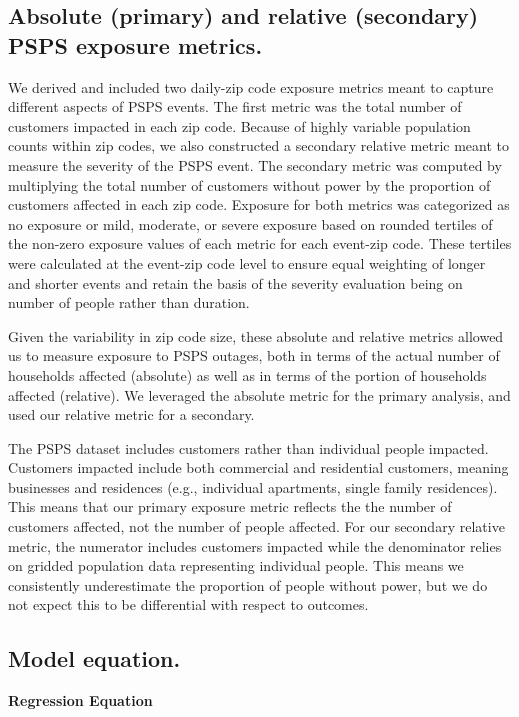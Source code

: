 \documentclass[../main.tex]{subfiles}
\begin{document}
\subsection{Absolute (primary) and relative (secondary) PSPS exposure metrics.}
We derived and included two daily-zip code exposure metrics  meant to capture different aspects of PSPS events. The first metric was the total number of customers impacted in each zip code. Because of highly variable population counts within zip codes, we also constructed a secondary relative metric meant to measure the severity of the PSPS event. The secondary metric was computed by multiplying the total number of customers without power by the proportion of customers affected in each zip code. Exposure for both metrics was categorized as no exposure or mild, moderate, or severe exposure based on rounded tertiles of the non-zero exposure values of each metric for each event-zip code. These tertiles were calculated at the event-zip code level to ensure equal weighting of longer and shorter events and retain the basis of the severity evaluation being on number of people rather than duration.  

Given the variability in zip code size, these absolute and relative metrics allowed us to measure exposure to PSPS outages, both in terms of the actual number of households affected (absolute) as well as in terms of the portion of households affected (relative). We leveraged the absolute metric for the primary analysis, and used our relative metric for a secondary.

The PSPS dataset includes customers rather than individual people impacted. Customers impacted include both commercial and residential customers, meaning businesses and residences (e.g., individual apartments, single family residences). This means that our primary exposure metric reflects the the number of customers affected, not the number of people affected. For our secondary relative metric, the numerator includes customers impacted while the denominator relies on gridded population data representing individual people. This means we consistently underestimate the proportion of people without power, but we do not expect this to be differential with respect to outcomes. 

\subsection{Model equation.}

\textbf{Regression Equation}
\end{document}

